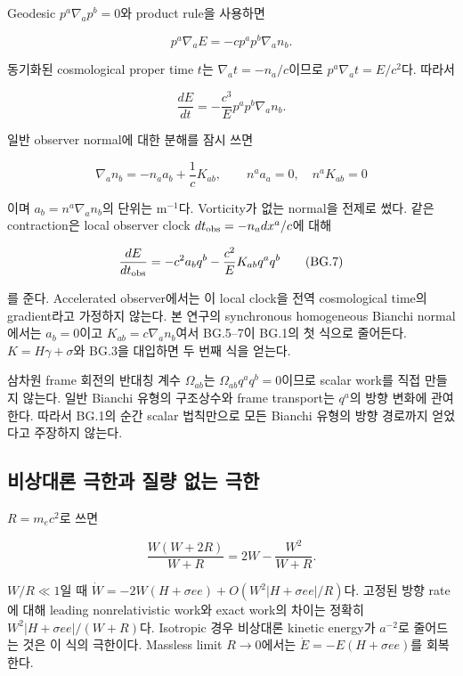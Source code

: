 \documentclass[11pt,a4paper]{article}
\begin{document}
Geodesic \(p^a\nabla_ap^b=0\)와 product rule을 사용하면

\[p^a\nabla_aE=-c p^ap^b\nabla_an_b.\tag{BG.4}\]

동기화된 cosmological proper time \(t\)는 \(\nabla_at=-n_a/c\)이므로 \(p^a\nabla_at=E/c^2\)다. 따라서

\[\frac{dE}{dt}=-\frac{c^3}{E}p^ap^b\nabla_an_b.\tag{BG.5}\]

일반 observer normal에 대한 분해를 잠시 쓰면

\[\nabla_an_b=-n_a a_b+\frac1cK_{ab},\qquad n^aa_a=0,\quad n^aK_{ab}=0\tag{BG.6}\]

이며 \(a_b=n^a\nabla_an_b\)의 단위는 m\(^{-1}\)다. Vorticity가 없는 normal을 전제로 썼다. 같은 contraction은 local observer clock \(dt_{\rm obs}=-n_a dx^a/c\)에 대해

\[\frac{dE}{dt_{\rm obs}}=-c^2 a_bq^b-\frac{c^2}{E}K_{ab}q^aq^b\tag{BG.7}\]

를 준다. Accelerated observer에서는 이 local clock을 전역 cosmological time의 gradient라고 가정하지 않는다. 본 연구의 synchronous homogeneous Bianchi normal에서는 \(a_b=0\)이고 \(K_{ab}=c\nabla_an_b\)여서 BG.5--7이 BG.1의 첫 식으로 줄어든다. \(K=H\gamma+\sigma\)와 BG.3을 대입하면 두 번째 식을 얻는다.

삼차원 frame 회전의 반대칭 계수 \(\Omega_{ab}\)는 \(\Omega_{ab}q^aq^b=0\)이므로 scalar work를 직접 만들지 않는다. 일반 Bianchi 유형의 구조상수와 frame transport는 \(q^a\)의 방향 변화에 관여한다. 따라서 BG.1의 순간 scalar 법칙만으로 모든 Bianchi 유형의 방향 경로까지 얻었다고 주장하지 않는다.

\hypertarget{uxbe44uxc0c1uxb300uxb860-uxadf9uxd55cuxacfc-uxc9c8uxb7c9-uxc5c6uxb294-uxadf9uxd55c}{%
\subsection{비상대론 극한과 질량 없는 극한}\label{uxbe44uxc0c1uxb300uxb860-uxadf9uxd55cuxacfc-uxc9c8uxb7c9-uxc5c6uxb294-uxadf9uxd55c}}

\(R=m_ec^2\)로 쓰면

\[\frac{W(W+2R)}{W+R}=2W-\frac{W^2}{W+R}.\tag{BG.8}\]

\(W/R\ll1\)일 때 \(\dot W=-2W(H+\sigma ee)+O(W^2|H+\sigma ee|/R)\)다. 고정된 방향 rate에 대해 leading nonrelativistic work와 exact work의 차이는 정확히 \(W^2|H+\sigma ee|/(W+R)\)다. Isotropic 경우 비상대론 kinetic energy가 \(a^{-2}\)로 줄어드는 것은 이 식의 극한이다. Massless limit \(R\to0\)에서는 \(\dot E=-E(H+\sigma ee)\)를 회복한다.
\end{document}
